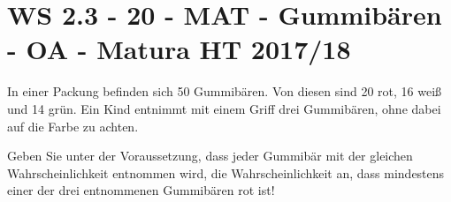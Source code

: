 \section{WS 2.3 - 20 - MAT - Gummibären - OA - Matura HT 2017/18}

\begin{beispiel}[WS 2.3]{1} %
In einer Packung befinden sich 50 Gummibären. Von diesen sind 20 rot, 16 weiß und 14 grün. Ein Kind entnimmt mit einem Griff drei Gummibären, ohne dabei auf die Farbe zu achten.

Geben Sie unter der Voraussetzung, dass jeder Gummibär mit der gleichen Wahrscheinlichkeit entnommen wird, die Wahrscheinlichkeit an, dass mindestens einer der drei entnommenen Gummibären rot ist!

\end{beispiel}